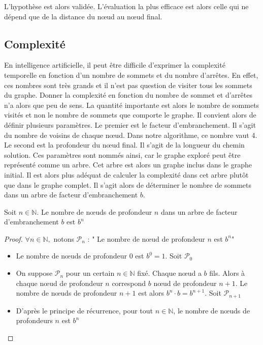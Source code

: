 L’hypothèse est alors validée. L’évaluation la plus efficace est alors celle qui ne dépend que de la distance du 
nœud au nœud final. 

\subsection{Complexité}

En intelligence artificielle, il peut être difficile d’exprimer la complexité temporelle en fonction d’un nombre de sommets et 
du nombre d’arrêtes. En effet, ces nombres sont très grands et il n’est pas question de visiter tous les sommets du graphe. 
Donner la complexité en fonction du nombre de sommet et d’arrêtes n’a alors que peu de sens. La quantité importante est alors 
le nombre de sommets visités et non le nombre de sommets que comporte le graphe.
Il convient alors de définir plusieurs paramètres. Le premier est le facteur d’embranchement. Il s’agit du nombre de voisins de 
chaque nœud. Dans notre algorithme, ce nombre vaut 4. Le second est la profondeur du nœud final. Il s’agit de la longueur du chemin 
solution.
Ces paramètres sont nommés ainsi, car le graphe exploré peut être représenté comme un arbre. Cet arbre est alors un graphe inclus 
dans le graphe initial.
Il est alors plus adéquat de calculer la complexité dans cet arbre plutôt que dans le graphe complet.
Il s’agit alors de déterminer le nombre de sommets dans un arbre de facteur d’embranchement $b$.

\begin{proposition}
    Soit $n \in \mathbb{N}$. Le nombre de nœuds de profondeur $n$ dans un arbre de facteur d'embranchement $b$ est $b^n$
\end{proposition}

\begin{proof}
    $\forall n \in \mathbb{N},$ notons $\mathcal{P}_n$ : " Le nombre de nœud de profondeur $n$ est $b^n$" \\
    \begin{itemize}
        \item Le nombre de nœuds de profondeur $0$ est $b^0=1$. Soit $\mathcal{P}_0$
        \item On suppose $\mathcal{P}_n$ pour un certain $n\in\mathbb{N}$ fixé. Chaque nœud a $b$ fils. Alors à chaque nœud de profondeur $n$ correspond $b$ nœud de profondeur $n+1$. Le nombre de nœuds de profondeur $n+1$ est alors $b^n\cdot b=b^{n+1}$. Soit $\mathcal{P}_{n+1}$
        \item D'après le principe de récurrence, pour tout $n \in \mathbb{N}$, le nombre de nœuds de profondeurs $n$ est $b^n$
    \end{itemize}
\end{proof}

